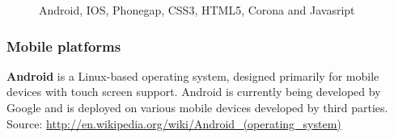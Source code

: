 \begin{figure}[!ht]
{}
\caption{Android, IOS, Phonegap, CSS3, HTML5, Corona and Javasript}
\end{figure}

\subsubsection{Mobile platforms}
{\bf Android} is a Linux-based operating system, designed primarily for mobile
devices with touch screen support. Android is currently being developed by
Google and is deployed on various mobile devices developed by third parties.
Source: \url{http://en.wikipedia.org/wiki/Android_(operating_system)}
\linebreak

